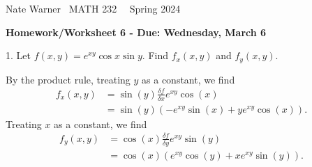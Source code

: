 \documentclass{report}
\title{\Huge{}}
\author{\huge{Nathan Warner}}
\date{\huge{}}
\begin{document}
    \pagebreak \bigbreak \noindent
    Nate Warner \ \quad \quad \quad \quad \quad \quad \quad \quad \quad \quad \quad \quad  MATH 232 \quad  \quad \quad \quad \quad \quad \quad \quad \quad \ \ \quad \quad Spring 2024
    \begin{center}
        \textbf{Homework/Worksheet 6 - Due: Wednesday, March 6}
    \end{center}
    \bigbreak \noindent 

    \begin{mdframed}
        1. Let $f(x, y)=e^{x y} \cos x \sin y$. Find $f_x(x, y)$ and $f_y(x, y)$.
    \end{mdframed}
    \bigbreak \noindent 
    By the product rule, treating $y$ as a constant, we find
    \begin{align*}
        f_{x}(x,y) &= \sin{\left(y\right)}\frac{\delta f}{\delta x}e^{xy}\cos{\left(x\right)} \\
        &=\sin{\left(y\right)}(-e^{xy}\sin{\left(x\right)} + ye^{xy}\cos{\left(x\right)})
    .\end{align*}
    \bigbreak \noindent 
    \bigbreak \noindent 
    Treating $x$ as a constant, we find
    \begin{align*}
        f_{y}(x,y) &= \cos{\left(x\right)} \frac{\delta f}{\delta y}e^{xy}\sin{\left(y\right)} \\
        &=\cos{\left(x\right)}(e^{xy}\cos{\left(y\right)} + xe^{xy}\sin{\left(y\right)})
    .\end{align*}
\end{document}
